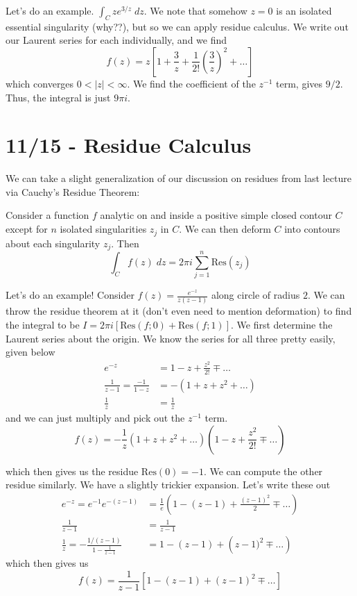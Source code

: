 \documentclass[10pt]{report}
\newcommand{\abs}[1]{\left|#1\right|}
\newcommand{\Res}[0]{\mathrm{Res} }
\begin{document}
Let's do an example. $\int_C ze^{3/z}\; dz$. We note that somehow $z=0$ is an isolated essential singularity (why??), but so we can apply residue calculus. We write out our Laurent series for each individually, and we find
$$f(z) = z\left[ 1 + \frac{3}{z} + \frac{1}{2!}\left( \frac{3}{z} \right)^2 +\dots \right]$$
which converges $0 < \abs{z} < \infty$. We find the coefficient of the $z^{-1}$ term, gives $9/2$. Thus, the integral is just $9\pi i$. 

\chapter{11/15 - Residue Calculus}

We can take a slight generalization of our discussion on residues from last lecture via Cauchy's Residue Theorem:
\begin{center}
    Consider a function $f$ analytic on and inside a positive simple closed contour $C$ except for $n$ isolated singularities $z_j$ in $C$. We can then deform $C$ into contours about each singularity $z_j$. Then
    $$\int_C f(z)\; dz = 2\pi i\sum_{j=1}^n \mathrm{Res}(z_j)$$
\end{center}

Let's do an example! Consider $f(z) = \frac{e^{-z}}{z(z-1)}$ along circle of radius $2$. We can throw the residue theorem at it (don't even need to mention deformation) to find the integral to be $I = 2\pi i\left[ \mathrm{Res}(f;0) + \mathrm{Res}(f;1) \right]$. We first determine the Laurent series about the origin. We know the series for all three pretty easily, given below
\begin{align*}
    e^{-z} &= 1-z+\frac{z^2}{2!} \mp\dots\\
    \frac{1}{z-1} = \frac{-1}{1-z} &= -\left( 1+z+z^2+\dots \right)\\
    \frac{1}{z} &= \frac{1}{z}
\end{align*}
and we can just multiply and pick out the $z^{-1}$ term.
$$f(z) = -\frac{1}{z}\left( 1+z+z^2+\dots \right)\left( 1-z+\frac{z^2}{2!}\mp\dots \right)$$

which then gives us the residue $\Res(0) = -1$. We can compute the other residue similarly. We have a slightly trickier expansion. Let's write these out
\begin{align*}
    e^{-z} = e^{-1}e^{-(z-1)} &= \frac{1}{e}\left( 1-(z-1) + \frac{(z-1)^2}{2}\mp\dots \right)\\
    \frac{1}{z-1} &= \frac{1}{z-1}\\
    \frac{1}{z} = -\frac{1/(z-1)}{1-\frac{1}{z-1}} &= 1-(z-1) + \left( z-1)^2 \mp\dots \right)
\end{align*}
which then gives us
$$f(z) = \frac{1}{z-1}\left[ 1-(z-1)+(z-1)^2\mp\dots \right]$$
\end{document}
